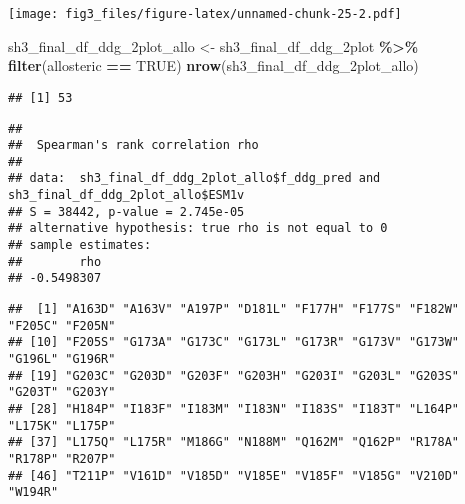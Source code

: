 \documentclass[
]{article}
\newenvironment{Shaded}{\begin{snugshade}}{\end{snugshade}}
\newcommand{\AttributeTok}[1]{\textcolor[rgb]{0.13,0.29,0.53}{#1}}
\newcommand{\CommentTok}[1]{\textcolor[rgb]{0.56,0.35,0.01}{\textit{#1}}}
\newcommand{\ConstantTok}[1]{\textcolor[rgb]{0.56,0.35,0.01}{#1}}
\newcommand{\FunctionTok}[1]{\textcolor[rgb]{0.13,0.29,0.53}{\textbf{#1}}}
\newcommand{\NormalTok}[1]{#1}
\newcommand{\OtherTok}[1]{\textcolor[rgb]{0.56,0.35,0.01}{#1}}
\newcommand{\SpecialCharTok}[1]{\textcolor[rgb]{0.81,0.36,0.00}{\textbf{#1}}}
\newcommand{\StringTok}[1]{\textcolor[rgb]{0.31,0.60,0.02}{#1}}
\begin{document}
\texttt{[image: fig3\_files/figure-latex/unnamed-chunk-25-2.pdf]}

\begin{Shaded}
\begin{Highlighting}[]
\NormalTok{sh3\_final\_df\_ddg\_2plot\_allo }\OtherTok{\textless{}{-}}\NormalTok{ sh3\_final\_df\_ddg\_2plot }\SpecialCharTok{\%\textgreater{}\%} \FunctionTok{filter}\NormalTok{(allosteric }\SpecialCharTok{==} \ConstantTok{TRUE}\NormalTok{)}
\FunctionTok{nrow}\NormalTok{(sh3\_final\_df\_ddg\_2plot\_allo)}
\end{Highlighting}
\end{Shaded}

\begin{verbatim}
## [1] 53
\end{verbatim}

\begin{Shaded}
\end{Shaded}

\begin{verbatim}
## 
##  Spearman's rank correlation rho
## 
## data:  sh3_final_df_ddg_2plot_allo$f_ddg_pred and sh3_final_df_ddg_2plot_allo$ESM1v
## S = 38442, p-value = 2.745e-05
## alternative hypothesis: true rho is not equal to 0
## sample estimates:
##        rho 
## -0.5498307
\end{verbatim}

\begin{Shaded}
\end{Shaded}

\begin{verbatim}
##  [1] "A163D" "A163V" "A197P" "D181L" "F177H" "F177S" "F182W" "F205C" "F205N"
## [10] "F205S" "G173A" "G173C" "G173L" "G173R" "G173V" "G173W" "G196L" "G196R"
## [19] "G203C" "G203D" "G203F" "G203H" "G203I" "G203L" "G203S" "G203T" "G203Y"
## [28] "H184P" "I183F" "I183M" "I183N" "I183S" "I183T" "L164P" "L175K" "L175P"
## [37] "L175Q" "L175R" "M186G" "N188M" "Q162M" "Q162P" "R178A" "R178P" "R207P"
## [46] "T211P" "V161D" "V185D" "V185E" "V185F" "V185G" "V210D" "W194R"
\end{verbatim}
\end{document}
